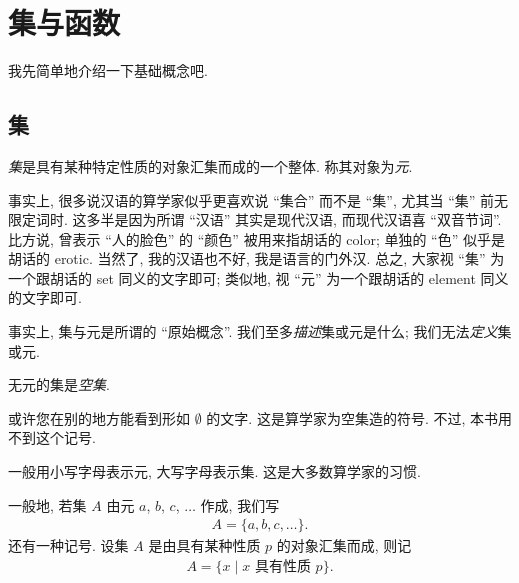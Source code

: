 \chapter{集与函数}

我先简单地介绍一下基础概念吧.

\section{集}

\begin{definition}
    \emph{集}是具有某种特定性质的对象汇集而成的一个整体. 称其对象为\emph{元}.
\end{definition}

\begin{remark}
    事实上, 很多说汉语的算学家似乎更喜欢说 ``集合'' 而不是 ``集'', 尤其当 ``集'' 前无限定词时. 这多半是因为所谓 ``汉语'' 其实是现代汉语, 而现代汉语喜 ``双音节词''. 比方说, 曾表示 ``人的脸色'' 的 ``颜色'' 被用来指胡话的 color; 单独的 ``色'' 似乎是胡话的 erotic. 当然了, 我的汉语也不好, 我是语言的门外汉. 总之, 大家视 ``集'' 为一个跟胡话的 set 同义的文字即可; 类似地, 视 ``元'' 为一个跟胡话的 element 同义的文字即可.
\end{remark}

\begin{remark}
    事实上, 集与元是所谓的 ``原始概念''. 我们至多\emph{描述}集或元是什么; 我们无法\emph{定义}集或元.
\end{remark}

\begin{definition}
    无元的集是\emph{空集}.
\end{definition}

\begin{remark}
    或许您在别的地方能看到形如 $\emptyset$ 的文字. 这是算学家为空集造的符号. 不过, 本书用不到这个记号.
\end{remark}

\begin{remark}
    一般用小写字母表示元, 大写字母表示集. 这是大多数算学家的习惯.
\end{remark}

\begin{definition}
    一般地, 若集 $A$ 由元 $a$, $b$, $c$, $\dots$ 作成, 我们写
    \begin{align*}
        A = \{ a,b,c,\dots \}.
    \end{align*}
    还有一种记号. 设集 $A$ 是由具有某种性质 $p$ 的对象汇集而成, 则记
    \begin{align*}
        A = \{ x \mid \text{$x$ 具有性质 $p$} \}.
    \end{align*}
\end{definition}

